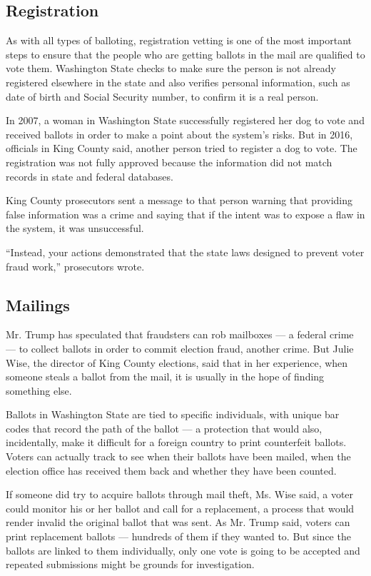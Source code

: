\hypertarget{registration}{%
\subsection{Registration}\label{registration}}

As with all types of balloting, registration vetting is one of the most
important steps to ensure that the people who are getting ballots in the
mail are qualified to vote them. Washington State checks to make sure
the person is not already registered elsewhere in the state and also
verifies personal information, such as date of birth and Social Security
number, to confirm it is a real person.

In 2007, a woman in Washington State successfully registered her dog to
vote and received ballots in order to make a point about the system's
risks. But in 2016, officials in King County said, another person tried
to register a dog to vote. The registration was not fully approved
because the information did not match records in state and federal
databases.

King County prosecutors sent a message to that person warning that
providing false information was a crime and saying that if the intent
was to expose a flaw in the system, it was unsuccessful.

``Instead, your actions demonstrated that the state laws designed to
prevent voter fraud work,'' prosecutors wrote.

\hypertarget{mailings}{%
\subsection{Mailings}\label{mailings}}

Mr. Trump has speculated that fraudsters can rob mailboxes --- a federal
crime --- to collect ballots in order to commit election fraud, another
crime. But Julie Wise, the director of King County elections, said that
in her experience, when someone steals a ballot from the mail, it is
usually in the hope of finding something else.

Ballots in Washington State are tied to specific individuals, with
unique bar codes that record the path of the ballot --- a protection
that would also, incidentally, make it difficult for a foreign country
to print counterfeit ballots. Voters can actually track to see when
their ballots have been mailed, when the election office has received
them back and whether they have been counted.

If someone did try to acquire ballots through mail theft, Ms. Wise said,
a voter could monitor his or her ballot and call for a replacement, a
process that would render invalid the original ballot that was sent. As
Mr. Trump said, voters can print replacement ballots --- hundreds of
them if they wanted to. But since the ballots are linked to them
individually, only one vote is going to be accepted and repeated
submissions might be grounds for investigation.

